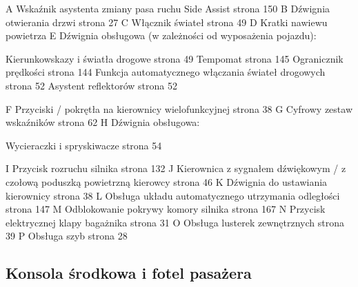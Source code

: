A Wskaźnik asystenta zmiany pasa ruchu Side Assist \guillemotright strona 150
B Dźwignia otwierania drzwi \guillemotright strona 27
C Włącznik świateł \guillemotright strona 49
D Kratki nawiewu powietrza
E Dźwignia obsługowa (w zależności od wyposażenia pojazdu):
\begin{itemizeTriangle}
	\itemTriangle Kierunkowskazy i światła drogowe \guillemotright strona 49
	\itemTriangle Tempomat \guillemotright strona 145
	\itemTriangle Ogranicznik prędkości \guillemotright strona 144
	\itemTriangle Funkcja automatycznego włączania świateł drogowych \guillemotright strona 52
	\itemTriangle Asystent reflektorów \guillemotright strona 52
\end{itemizeTriangle}
F Przyciski / pokrętła na kierownicy wielofunkcyjnej \guillemotright strona 38
G Cyfrowy zestaw wskaźników \guillemotright strona 62
H Dźwignia obsługowa:
\begin{itemizeTriangle}
	\itemTriangle Wycieraczki i spryskiwacze \guillemotright strona 54
\end{itemizeTriangle}
I Przycisk rozruchu silnika \guillemotright strona 132
J Kierownica z sygnałem dźwiękowym / z czołową poduszką powietrzną kierowcy \guillemotright strona 46
K Dźwignia do ustawiania kierownicy \guillemotright strona 38
L Obsługa układu automatycznego utrzymania odległości \guillemotright strona 147
M Odblokowanie pokrywy komory silnika \guillemotright strona 167
N Przycisk elektrycznej klapy bagażnika \guillemotright strona 31
O Obsługa lusterek zewnętrznych \guillemotright strona 39
P Obsługa szyb \guillemotright strona 28

\subsection{Konsola środkowa i fotel pasażera}


